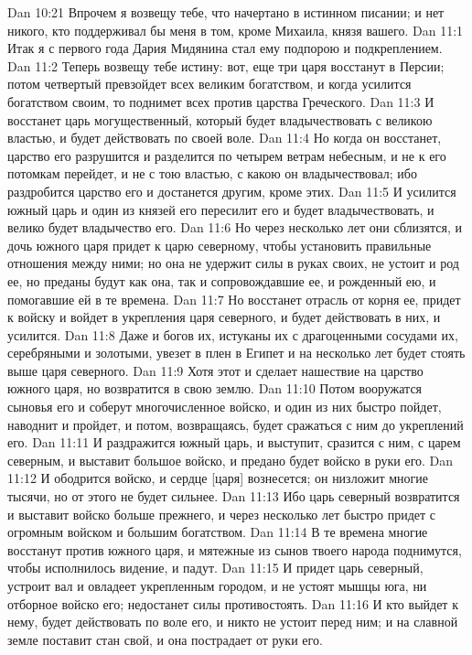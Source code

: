 Dan 10:21  Впрочем я возвещу тебе, что начертано в истинном писании; и нет никого, кто поддерживал бы меня в том, кроме Михаила, князя вашего.
Dan 11:1  Итак я с первого года Дария Мидянина стал ему подпорою и подкреплением.
Dan 11:2  Теперь возвещу тебе истину: вот, еще три царя восстанут в Персии; потом четвертый превзойдет всех великим богатством, и когда усилится богатством своим, то поднимет всех против царства Греческого.
Dan 11:3  И восстанет царь могущественный, который будет владычествовать с великою властью, и будет действовать по своей воле.
Dan 11:4  Но когда он восстанет, царство его разрушится и разделится по четырем ветрам небесным, и не к его потомкам перейдет, и не с тою властью, с какою он владычествовал; ибо раздробится царство его и достанется другим, кроме этих.
Dan 11:5  И усилится южный царь и один из князей его пересилит его и будет владычествовать, и велико будет владычество его.
Dan 11:6  Но через несколько лет они сблизятся, и дочь южного царя придет к царю северному, чтобы установить правильные отношения между ними; но она не удержит силы в руках своих, не устоит и род ее, но преданы будут как она, так и сопровождавшие ее, и рожденный ею, и помогавшие ей в те времена.
Dan 11:7  Но восстанет отрасль от корня ее, придет к войску и войдет в укрепления царя северного, и будет действовать в них, и усилится.
Dan 11:8  Даже и богов их, истуканы их с драгоценными сосудами их, серебряными и золотыми, увезет в плен в Египет и на несколько лет будет стоять выше царя северного.
Dan 11:9  Хотя этот и сделает нашествие на царство южного царя, но возвратится в свою землю.
Dan 11:10  Потом вооружатся сыновья его и соберут многочисленное войско, и один из них быстро пойдет, наводнит и пройдет, и потом, возвращаясь, будет сражаться с ним до укреплений его.
Dan 11:11  И раздражится южный царь, и выступит, сразится с ним, с царем северным, и выставит большое войско, и предано будет войско в руки его.
Dan 11:12  И ободрится войско, и сердце [царя] вознесется; он низложит многие тысячи, но от этого не будет сильнее.
Dan 11:13  Ибо царь северный возвратится и выставит войско больше прежнего, и через несколько лет быстро придет с огромным войском и большим богатством.
Dan 11:14  В те времена многие восстанут против южного царя, и мятежные из сынов твоего народа поднимутся, чтобы исполнилось видение, и падут.
Dan 11:15  И придет царь северный, устроит вал и овладеет укрепленным городом, и не устоят мышцы юга, ни отборное войско его; недостанет силы противостоять.
Dan 11:16  И кто выйдет к нему, будет действовать по воле его, и никто не устоит перед ним; и на славной земле поставит стан свой, и она пострадает от руки его.
